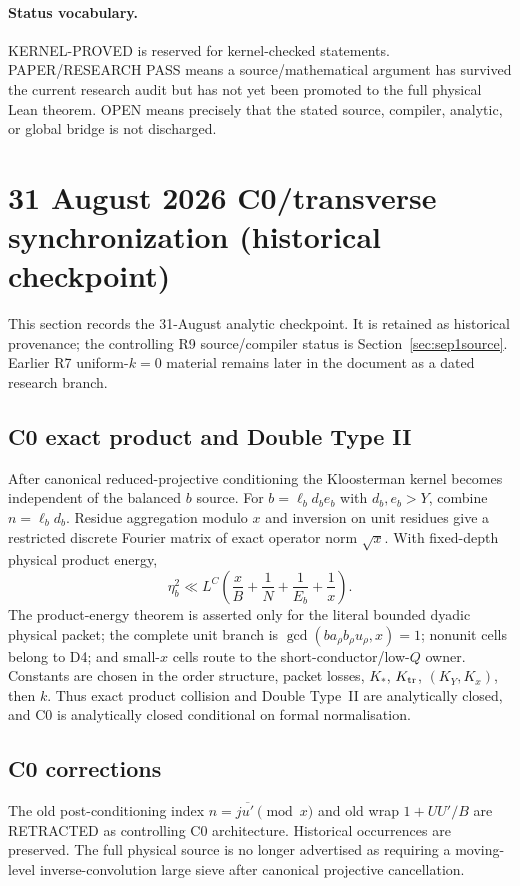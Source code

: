 \documentclass[11pt]{article}
\theoremstyle{definition}
\newcommand{\1}{\mathbf 1}
\newcommand{\status}[1]{\textsf{#1}}
\begin{document}
\paragraph{Status vocabulary.}
\status{KERNEL-PROVED} is reserved for kernel-checked statements.  \status{PAPER/RESEARCH
PASS} means a source/mathematical argument has survived the current research audit but has
not yet been promoted to the full physical Lean theorem.  \status{OPEN} means precisely
that the stated source, compiler, analytic, or global bridge is not discharged.

\tableofcontents



\section{31 August 2026 C0/transverse synchronization (historical checkpoint)}\label{sec:aug31sync}

This section records the 31-August analytic checkpoint.  It is retained as historical
provenance; the controlling R9 source/compiler status is Section~\ref{sec:sep1source}. Earlier R7
uniform-$k=0$ material remains later in the document as a dated research branch.

\subsection{C0 exact product and Double Type II}
After canonical reduced-projective conditioning the Kloosterman kernel becomes independent
of the balanced $b$ source. For $b=\ell_b d_b e_b$ with $d_b,e_b>Y$, combine
$n=\ell_b d_b$. Residue aggregation modulo $x$ and inversion on unit residues give a
restricted discrete Fourier matrix of exact operator norm $\sqrt{x}$. With fixed-depth
physical product energy,
\[
\boxed{\eta_b^2\ll L^C\left(\frac{x}{B}+\frac1N+\frac1{E_b}+\frac1x\right)}.
\]
The product-energy theorem is asserted only for the literal bounded dyadic physical packet;
the complete unit branch is $\gcd(b a_\rho b_\rho u_\rho,x)=1$; nonunit cells belong to D4;
and small-$x$ cells route to the short-conductor/low-$Q$ owner. Constants are chosen in the
order structure, packet losses, $K_*$, $K_{\rm tr}$, $(K_Y,K_x)$, then $k$. Thus exact
product collision and Double Type~II are analytically closed, and C0 is analytically closed
conditional on formal normalisation.

\subsection{C0 corrections}
The old post-conditioning index $n=j\overline{u'}\pmod x$ and old wrap $1+UU'/B$ are
\status{RETRACTED} as controlling C0 architecture. Historical occurrences are preserved.
The full physical source is no longer advertised as requiring a moving-level
inverse-convolution large sieve after canonical projective cancellation.
\end{document}
